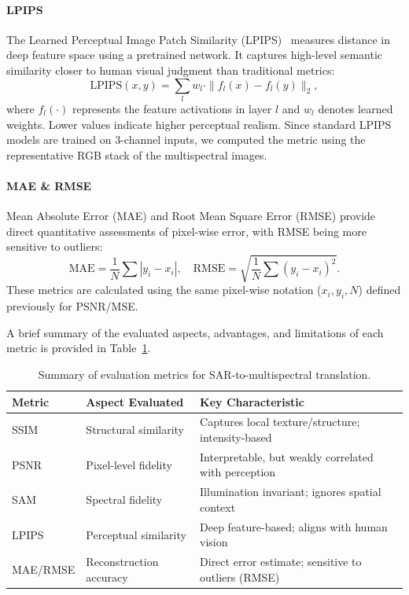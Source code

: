 \paragraph{\textbf{LPIPS}} 
The Learned Perceptual Image Patch Similarity (LPIPS)~\cite{iqa_lpips} measures distance in deep feature space using a pretrained network. It captures high-level semantic similarity closer to human visual judgment than traditional metrics:
\begin{equation}
\text{LPIPS}(x,y) = \sum_{l} w_l \cdot \| f_l(x) - f_l(y) \|_2,
\end{equation}
where $f_l(\cdot)$ represents the feature activations in layer $l$ and $w_l$ denotes learned weights. Lower values indicate higher perceptual realism. Since standard LPIPS models are trained on 3-channel inputs, we computed the metric using the representative RGB stack of the multispectral images.

\paragraph{\textbf{MAE \& RMSE}} Mean Absolute Error (MAE) and Root Mean Square Error (RMSE) provide direct quantitative assessments of pixel-wise error, with RMSE being more sensitive to outliers:
\begin{equation}
\mathrm{MAE} = \frac{1}{N} \sum |y_i - x_i|, \quad \mathrm{RMSE} = \sqrt{\frac{1}{N} \sum (y_i - x_i)^2}.
\end{equation}
These metrics are calculated using the same pixel-wise notation ($x_i, y_i, N$) defined previously for PSNR/MSE.

A brief summary of the evaluated aspects, advantages, and limitations of each metric is provided in Table~\ref{tab:evaluation_metrics}.

\begin{table}[!htbp]
    \centering
    \caption{Summary of evaluation metrics for SAR-to-multispectral translation.}
    \label{tab:evaluation_metrics}
    \small
    \begin{tabularx}{\textwidth}{l X l}
        \toprule
        \textbf{Metric} & \textbf{Aspect Evaluated} & \textbf{Key Characteristic} \\
        \midrule
        SSIM  & Structural similarity & Captures local texture/structure; intensity-based \\
        PSNR  & Pixel-level fidelity & Interpretable, but weakly correlated with perception \\
        SAM   & Spectral fidelity & Illumination invariant; ignores spatial context \\
        LPIPS & Perceptual similarity & Deep feature-based; aligns with human vision \\ 
        MAE/RMSE & Reconstruction accuracy & Direct error estimate; sensitive to outliers (RMSE) \\
        \bottomrule
    \end{tabularx}
\end{table}